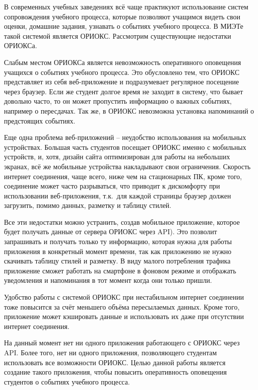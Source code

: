 \Introduction
{}
В современных учебных заведениях всё чаще практикуют использование систем сопровождения учебного процесса, которые позволяют учащимся видеть свои оценки, домашние задания, узнавать о событиях учебного процесса.
В МИЭТе такой системой является ОРИОКС\@.
Рассмотрим существующие недостатки ОРИОКСа.

Слабым местом ОРИОКСа является невозможность оперативного оповещения учащихся о событиях учебного процесса.
Это обусловлено тем, что ОРИОКС представляет из себя веб-приложение
и подразумевает регулярное посещение через браузер.
Если же студент долгое время не заходит в систему, что бывает довольно часто, то он может пропустить информацию о важных событиях, например о пересдачах.
Так же, в ОРИОКС невозможна установка напоминаний о предстоящих событиях.

Еще одна проблема веб-приложений – неудобство использования на мобильных
устройствах.
Большая часть студентов посещает ОРИОКС именно с мобильных
устройств, и, хотя, дизайн сайта оптимизирован для работы на небольших экранах, всё же мобильные устройства накладывают свои ограничения.
Скорость интернет соединения, чаще всего, ниже чем на стационарных ПК,
кроме того, соединение может часто разрываться, что приводит к дискомфорту
при использовании веб-приложения, т.к.\ для каждой страницы браузер должен
загрузить, помимо данных, разметку и таблицу стилей.

Все эти недостатки можно устранить, создав мобильное приложение,
которое
будет получать данные от сервера ОРИОКС через API).
Это позволит запрашивать и получать только ту информацию, которая нужна для работы приложения в конкретный момент времени, так как приложению не нужно скачивать таблицу стилей и разметку.
В виду малого потребления трафика приложение сможет работать на смартфоне в фоновом режиме и отображать уведомления и напоминания в тот момент когда они только пришли.

Удобство работы с системой ОРИОКС при нестабильном интернет соединении тоже повысится за счёт меньшего объёма пересылаемых данных.
Кроме того, приложение может кэшировать
данные и использовать их даже при отсутствии интернет соединения.

На данный момент нет ни одного приложения работающего с ОРИОКС через API\@.
Более того, нет ни одного приложения, позволяющего студентам использовать все возможности ОРИОКС\@.
Целью данной работы является создание такого приложения, чтобы повысить оперативность оповещения студентов о событиях учебного процесса.
